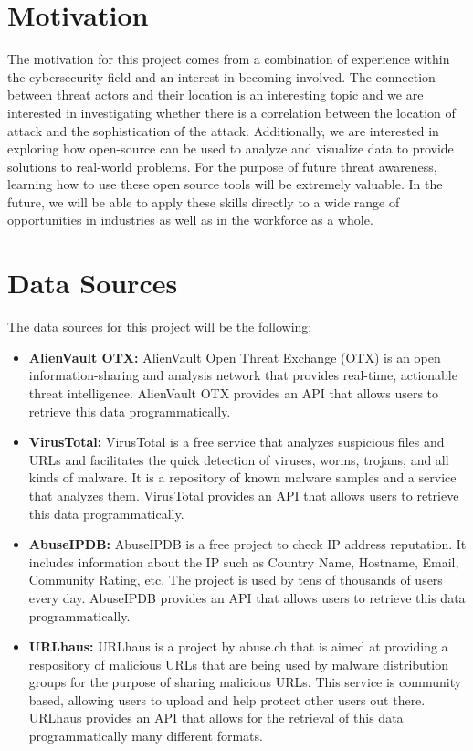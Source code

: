 \documentclass[letterpaper, 10 pt, conference]{ieeeconf}  %
\begin{document}
\section{Motivation}

The motivation for this project comes from a combination of experience within the cybersecurity field and an interest in becoming involved. 
The connection between threat actors and their location is an interesting topic and we are interested in investigating whether there is a correlation between the location of attack and the sophistication of the attack. 
Additionally, we are interested in exploring how open-source can be used to analyze and visualize data to provide solutions to real-world problems. For the purpose of future threat awareness, learning how to use these open source tools will be extremely valuable. In the future, we will be able to apply these skills directly to a wide range of opportunities in industries as well as in the workforce as a whole.

\section{Data Sources}

The data sources for this project will be the following:

\begin{itemize}
    \item \textbf{AlienVault OTX:} AlienVault Open Threat Exchange (OTX) is an open information-sharing and analysis network that provides real-time, actionable threat intelligence. AlienVault OTX provides an API that allows users to retrieve this data programmatically. 
    \item \textbf{VirusTotal:} VirusTotal is a free service that analyzes suspicious files and URLs and facilitates the quick detection of viruses, worms, trojans, and all kinds of malware. It is a repository of known malware samples and a service that analyzes them. VirusTotal provides an API that allows users to retrieve this data programmatically.
    \item \textbf{AbuseIPDB:} AbuseIPDB is a free project to check IP address reputation. It includes information about the IP such as Country Name, Hostname, Email, Community Rating, etc. The project is used by tens of thousands of users every day. AbuseIPDB provides an API that allows users to retrieve this data programmatically.
    \item \textbf{URLhaus:} URLhaus is a project by abuse.ch that is aimed at providing a respository of malicious URLs that are being used by malware distribution groups for the purpose of sharing malicious URLs. This service is community based, allowing users to upload and help protect other users out there. URLhaus provides an API that allows for the retrieval of this data programmatically many different formats.
\end{itemize}
\end{document}
